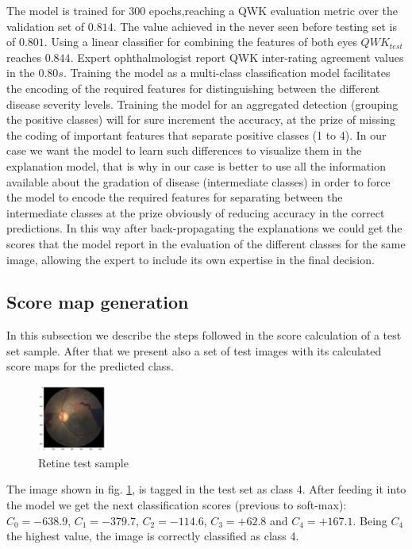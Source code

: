 \documentclass[preprint]{elsarticle}
\theoremstyle{definition} %
\theoremstyle{remark}
\begin{document}
The model is trained for 300 epochs,reaching a QWK evaluation metric over the validation set of $0.814$. The value achieved in the never seen before testing set is of $0.801$. Using a linear classifier for combining the features of both eyes $QWK_{test}$ reaches $0.844$. Expert ophthalmologist report QWK inter-rating agreement values in the $0.80s$. Training the model as a multi-class classification model facilitates the encoding of the required features for distinguishing between the different disease severity levels. Training the model for an aggregated detection (grouping the positive classes) will for sure increment the accuracy, at the prize of missing the coding of important features that separate positive classes (1 to 4). In our case we want the model to learn such differences to visualize them in the explanation model, that is why in our case is better to use all the information available about the gradation of disease (intermediate classes) in order to force the model to encode the required features for separating between the intermediate classes at the prize obviously of reducing accuracy in the correct predictions. In this way after back-propagating the explanations we could get the scores that the model report in the evaluation of the different classes for the same image, allowing the expert to include its own expertise in the final decision.

\subsection{Score map generation}

In this subsection we describe the steps followed in the score calculation of a test set sample. After that we present also a set of test images with its calculated score maps for the predicted class. 

\begin{figure}
	\centering
	\includegraphics[width=0.20\textwidth]{figures/score_prop_23713_left/retine.png}
	\caption{Retine test sample}
	\label{fig:retine_test1}
\end{figure}

The image shown in fig. \ref{fig:retine_test1}, is tagged in the test set as class 4. After feeding it into the model we get the next classification scores (previous to soft-max): $C_0 = -638.9$, $C_1 = -379.7$, $C_2 = -114.6$, $C_3 = +62.8$ and $C_4 = +167.1$. Being $C_4$ the highest value, the image is correctly classified as class 4. 
\end{document}
